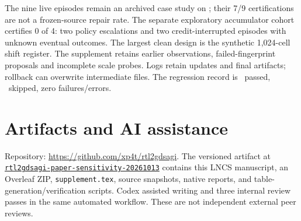 \documentclass[runningheads]{llncs}
\newcommand{\code}[1]{\texttt{#1}}
\begin{document}
The nine live episodes remain an archived case study on
\code{\ProposalSourceShort}; their 7/9 certifications are not a frozen-source
repair rate. The separate exploratory accumulator cohort certifies 0 of 4:
two policy escalations and two credit-interrupted episodes with unknown
eventual outcomes. The largest clean design is the synthetic 1,024-cell shift
register. The supplement retains earlier observations, failed-fingerprint
proposals and incomplete scale probes. Logs retain updates and final artifacts;
rollback can overwrite intermediate files. The regression record is
\TestPasses\ passed, \TestSkipped\ skipped, zero failures/errors.

\section*{Artifacts and AI assistance}
Repository: \url{https://github.com/xp4t/rtl2gdsagi}. The versioned artifact at
\href{https://github.com/xp4t/rtl2gdsagi/releases/tag/rtl2gdsagi-paper-sensitivity-20261013}{\code{rtl2gdsagi-paper-sensitivity-20261013}}
contains this LNCS manuscript, an Overleaf ZIP, \code{supplement.tex}, source
snapshots, native reports, and table-generation/verification scripts. Codex
assisted writing and three internal review passes in the same automated
workflow. These are not independent external peer reviews.
\FloatBarrier
\end{document}
